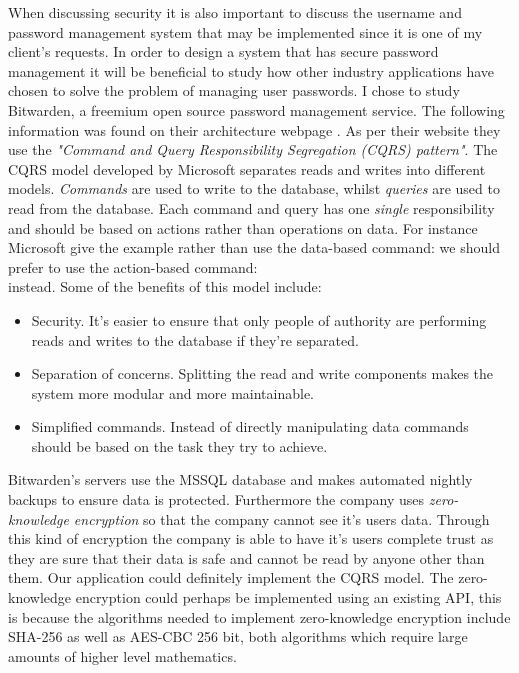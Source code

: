 When discussing security it is also important to discuss the 
username and password management system that may be implemented
since it is one of my client's requests. In order to design a 
system that has secure password management it will be 
beneficial to study how other industry applications have chosen
to solve the problem of managing user passwords. I chose to 
study Bitwarden, a freemium open source password management 
service. The following information was found on their 
architecture webpage \cite{Bitwarden}. As per their website 
they use the \textit{"Command and Query Responsibility 
Segregation (CQRS) pattern"}. The CQRS model developed by 
Microsoft separates reads and writes into different models. 
\textit{Commands} are used to write to the database, whilst 
\textit{queries} are used to read from the database. Each 
command and query has one \emph{single} responsibility and 
should be based on actions rather than operations on data. For
instance Microsoft give the example rather than use the
data-based command: 
we should prefer to use the action-based command: \\
 instead. Some of the benefits of 
this model include: 

\begin{itemize}
  \item Security. It's easier to ensure that only people of authority are performing reads and writes to the database if 
they're separated.

  \item Separation of concerns. Splitting the read and write components makes the system more modular and more maintainable. 

  \item Simplified commands. Instead of directly manipulating data commands should be based on the task they try to 
achieve.
\end{itemize}

Bitwarden's servers use the MSSQL database and makes automated
nightly backups to ensure data is protected. Furthermore the 
company uses \textit{zero-knowledge encryption} so that the 
company cannot see it's users data. Through this kind of 
encryption the company is able to have it's users complete 
trust as they are sure that their data is safe and cannot be
read by anyone other than them. Our application could 
definitely implement the CQRS model. The zero-knowledge 
encryption could perhaps be implemented using an existing API,
this is because the algorithms needed to implement 
zero-knowledge encryption include SHA-256 as well as 
AES-CBC 256 bit, both algorithms which require large amounts of 
higher level mathematics.

